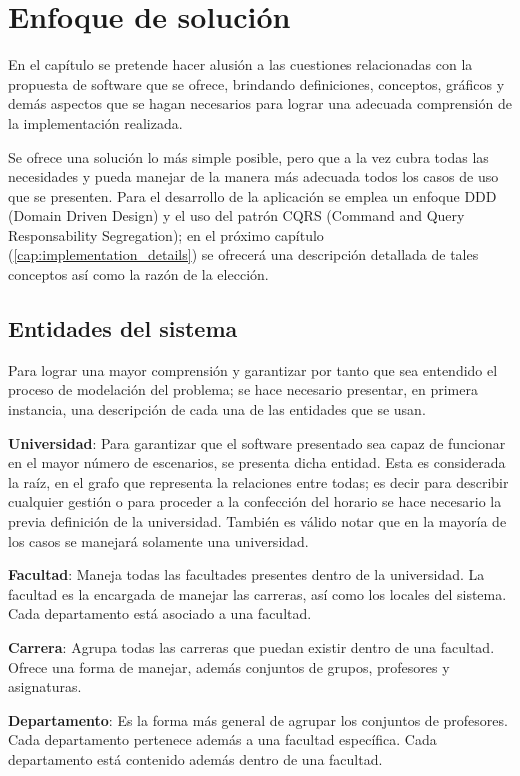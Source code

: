 \chapter{Enfoque de solución}

En el capítulo se pretende hacer alusión a las cuestiones relacionadas con la propuesta de software que se ofrece, brindando definiciones, conceptos, gráficos y demás aspectos que se hagan necesarios para lograr una adecuada comprensión de la implementación realizada.

Se ofrece una solución lo más simple posible, pero que a la vez cubra todas las necesidades y pueda manejar de la manera más adecuada todos los casos de uso que se presenten. Para el desarrollo de la aplicación se emplea un enfoque DDD (Domain Driven Design) y el uso del patrón CQRS (Command and Query Responsability Segregation); en el próximo capítulo (\ref{cap:implementation_details}) se ofrecerá una descripción detallada de tales conceptos así como la razón de la elección.


\section{Entidades del sistema}

Para lograr una mayor comprensión y garantizar por tanto que sea entendido el proceso de modelación del problema; se hace necesario presentar, en primera instancia, una descripción de cada una de las entidades que se usan.

\textbf{Universidad}: Para garantizar que el software presentado sea capaz de funcionar en el mayor número de escenarios, se presenta dicha entidad. Esta es considerada la raíz, en el grafo que representa la relaciones entre todas; es decir para describir cualquier gestión o para proceder a la confección del horario se hace necesario la previa definición de la universidad. También es válido notar que en la mayoría de los casos se manejará solamente  una universidad.

\textbf{Facultad}: Maneja todas las facultades presentes dentro de la universidad. La facultad es la encargada de manejar las carreras, así como los locales del sistema. Cada departamento está asociado a una facultad.

\textbf{Carrera}: Agrupa todas las carreras que puedan existir dentro de una facultad. Ofrece una forma de manejar, además conjuntos de grupos, profesores y asignaturas.

\textbf{Departamento}: Es la forma más general de agrupar los conjuntos de profesores. Cada departamento pertenece además a una facultad específica. Cada departamento está contenido además dentro de una facultad.

